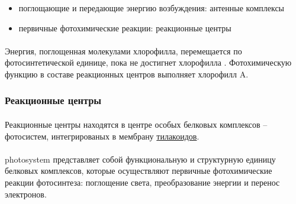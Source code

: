 \begin{itemize}

	\item поглощающие и передающие энергию возбуждения: антенные комплексы
	\item первичные фотохимические реакции: реакционные центры


\end{itemize}



\paragraph*{}Энергия, поглощенная молекулами хлорофилла, перемещается по фотосинтетической единице, пока не достигнет хлорофилла . Фотохимическую функцию в составе реакционных центров выполняет хлорофилл A.

\subsubsection*{Реакционные центры}

\paragraph*{}Реакционные центры находятся в центре особых белковых комплексов -- \hypertarget{photosystems}{фотосистем}, интегрированых в мембрану \hyperlink{cell_plastids}{тилакоидов}. 

\paragraph*{}\gls{photosystem} представляет собой функциональную и структурную единицу белковых комплексов, которые осуществляют первичные фотохимические реакции фотосинтеза: поглощение света, преобразование энергии и перенос электронов. 

